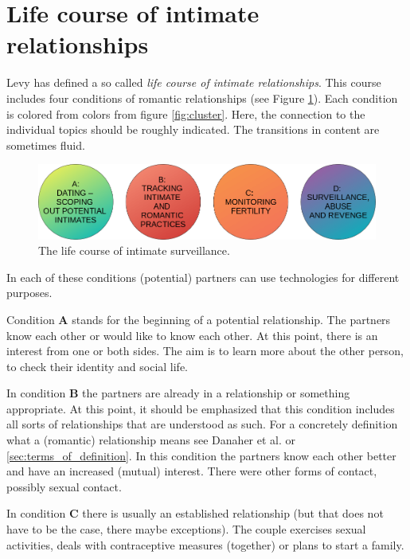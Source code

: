 \section{Life course of intimate relationships}
\label{sec:life_course}
Levy \cite{levy2014intimate} has defined a so called \textit{life course of intimate relationships}. This course includes four conditions of romantic relationships (see Figure \ref{fig:live_course}). Each condition is colored from colors from figure \ref{fig:cluster}. Here, the connection to the individual topics should be roughly indicated. The transitions in content are sometimes fluid.
\begin{figure}[htb]
    \centering
	\includegraphics[width=\linewidth]{img/life_course_of_intimate_surveillance.png}
	\caption{The life course of intimate surveillance.}
	\label{fig:live_course}
\end{figure}

In each of these conditions (potential) partners can use technologies for different purposes.

Condition \textbf{A} stands for the beginning of a potential relationship. The partners know each other or would like to know each other. At this point, there is an interest from one or both sides. The aim is to learn more about the other person, to check their identity and social life.

In condition \textbf{B} the partners are already in a relationship or something appropriate. At this point, it should be emphasized that this condition includes all sorts of relationships that are understood as such. For a concretely definition what a (romantic) relationship means see Danaher et al. \cite{doi:10.1080/15265161.2017.1409823} or \ref{sec:terms_of_definition}. In this condition the partners know each other better and have an increased (mutual) interest. There were other forms of contact, possibly sexual contact.

In condition \textbf{C} there is usually an established relationship (but that does not have to be the case, there maybe exceptions). The couple exercises sexual activities, deals with contraceptive measures (together) or plans to start a family.

